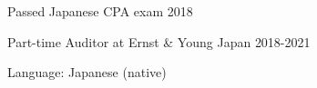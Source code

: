 

\begin{cventries}

\cventrysimple
    {Passed Japanese CPA exam}  %
    {2018} %
    {}

\cventrysimple
    {Part-time Auditor at Ernst \& Young Japan}  %
    {2018-2021} %
    {}

\cventrysimple
    {Language: Japanese (native)}  %
    {} %
    {}



\end{cventries}
